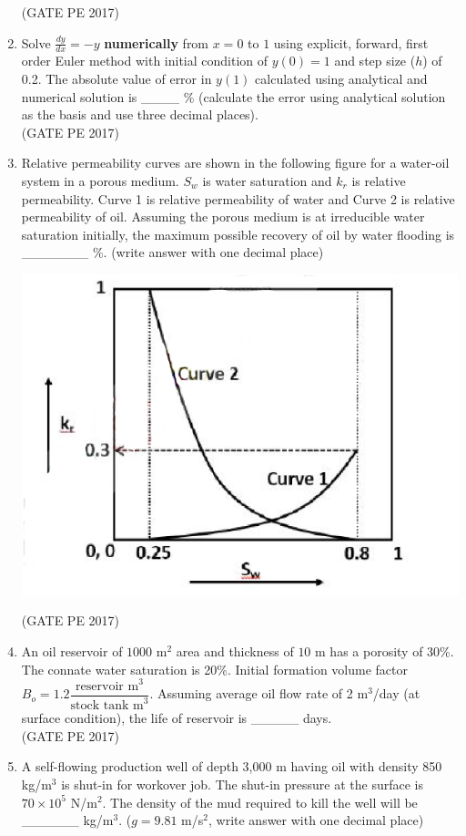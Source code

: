 \documentclass[journal,12pt,onecolumn]{IEEEtran}
\theoremstyle{remark}
\begin{document}
\begin{enumerate}[start=1, label={Q\arabic*.}]
\hfill{(GATE PE 2017)}

\item Solve $ \frac{dy}{dx} = -y$ \textbf{numerically} from $x = 0$ to $1$ using explicit, forward, first order Euler method with initial condition of $y(0) = 1$ and step size ($h$) of 0.2. The absolute value of error in $y(1)$ calculated using analytical and numerical solution is \_\_\_\_ \% (calculate the error using analytical solution as the basis and use three decimal places).\\

\hfill{(GATE PE 2017)}

\item Relative permeability curves are shown in the following figure for a water-oil system in a porous medium. $S_w$ is water saturation and $k_r$ is relative permeability. Curve 1 is relative permeability of water and Curve 2 is relative permeability of oil.
Assuming the porous medium is at irreducible water saturation initially, the maximum possible recovery of oil by water flooding is \_\_\_\_\_\_\_ \%. (write answer with one decimal place)\\

\begin{center}
    \includegraphics[width=0.5\columnwidth]{Figs/GraphQ_29.png} 
\end{center}
\hfill{(GATE PE 2017)}

\item An oil reservoir of $1000$ m$^2$ area and thickness of $10$ m has a porosity of 30\%. The connate water saturation is 20\%. Initial formation volume factor $B_o = 1.2 \dfrac{\text{reservoir m}^3}{\text{stock tank m}^3}$. Assuming average oil flow rate of 2 m$^3$/day (at surface condition), the life of reservoir is \_\_\_\_\_ days.\\

\hfill{(GATE PE 2017)}

\item A self-flowing production well of depth 3,000 m having oil with density 850 kg/m$^3$ is shut-in for workover job. The shut-in pressure at the surface is $70 \times 10^5$ N/m$^2$. The density of the mud required to kill the well will be \_\_\_\_\_\_ kg/m$^3$. ($g = 9.81$ m/s$^2$, write answer with one decimal place)\\


\end{enumerate}
\end{document}
